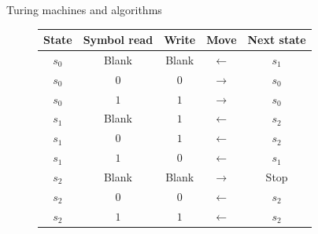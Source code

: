\begin{vbframe}{Turing machines and algorithms}
\begin{figure}
	\begin{footnotesize}
	\begin{tabular}{|c|c|c|c|c|}
		\hline 
		\textbf{State} & \textbf{Symbol read} & \textbf{Write} & \textbf{Move} & \textbf{Next state} \\ 
		\hline 
		$s_0$ & Blank & Blank & $\leftarrow$ & $s_1$ \\ 
		$s_0$ & $0$ & $0$ & $\rightarrow$ & $s_0$ \\
		$s_0$ & $1$ & $1$ &  $\rightarrow$ & $s_0$ \\
		\hline 
		$s_1$ & Blank & $1$ & $\leftarrow$ & $s_2$ \\ 
		$s_1$ & $0$ & $1$ & $\leftarrow$ & $s_2$ \\
		$s_1$ & $1$ & $0$ &  $\leftarrow$ & $s_1$ \\
		\hline 
		$s_2$ & Blank & Blank & $\rightarrow$ & Stop \\ 
		$s_2$ & $0$ & $0$ & $\leftarrow$ & $s_2$ \\
		$s_2$ & $1$ & $1$ &  $\leftarrow$ & $s_2$ \\
		\hline 
	\end{tabular} 
	\end{footnotesize}
	
\end{figure}

\end{vbframe}






